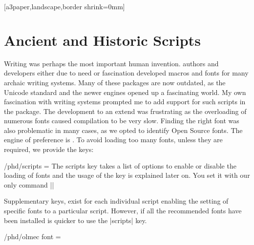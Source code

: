 
[a3paper,landscape,border shrink=0mm]

\chapter{Ancient and Historic Scripts}

Writing was perhaps the most important human invention. \tex authors and developers either due to need or fascination developed macros and fonts for many archaic writing systems. Many of these packages are now outdated, as the Unicode standard and the newer engines opened up a fascinating world. My own fascination with writing systems prompted me to add support for such scripts in the  package. The development to an extend was frustrating as the overloading of numerous fonts caused compilation to be very slow. Finding the right font was also problematic in many cases, as we opted to identify Open Source fonts. The \tex engine of preference is \luatex. To avoid loading too many fonts, unless they are required, we provide the keys:

\def\loadscripts{}
\cxset{scripts/.store in = \loadscripts}

\begin{key}{/phd/scripts = } The scripts key takes a list of options to enable or disable the loading of fonts and the usage of the key is explained later on. You set it with our only command |\cxset|
\end{key}

Supplementary keys, exist for each individual script enabling the setting of specific fonts to a particular script. However, if all the recommended fonts have been installed is quicker to use the |scripts| key.

\def\olmecfontstore{}

\cxset{olmec font/.store in=\olmecfontstore}


\begin{key}{/phd/olmec font = }
\end{key}

